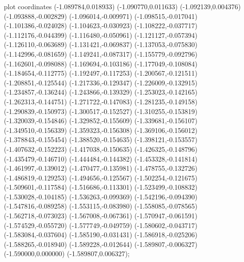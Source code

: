 { plot coordinates {(-1.089784,0.018933) (-1.090770,0.011633) (-1.092139,0.004376) (-1.093888,-0.002829) (-1.096014,-0.009971) (-1.098515,-0.017041) (-1.101386,-0.024028) (-1.104623,-0.030923) (-1.108222,-0.037717) (-1.112176,-0.044399) (-1.116480,-0.050961) (-1.121127,-0.057394) (-1.126110,-0.063689) (-1.131421,-0.069837) (-1.137053,-0.075830) (-1.142996,-0.081659) (-1.149241,-0.087317) (-1.155779,-0.092796) (-1.162601,-0.098088) (-1.169694,-0.103186) (-1.177049,-0.108084) (-1.184654,-0.112775) (-1.192497,-0.117253) (-1.200567,-0.121511) (-1.208851,-0.125544) (-1.217336,-0.129347) (-1.226009,-0.132915) (-1.234857,-0.136244) (-1.243866,-0.139329) (-1.253023,-0.142165) (-1.262313,-0.144751) (-1.271722,-0.147083) (-1.281235,-0.149158) (-1.290839,-0.150973) (-1.300517,-0.152527) (-1.310255,-0.153819) (-1.320039,-0.154846) (-1.329852,-0.155609) (-1.339681,-0.156107) (-1.349510,-0.156339) (-1.359323,-0.156308) (-1.369106,-0.156012) (-1.378843,-0.155454) (-1.388520,-0.154635) (-1.398121,-0.153557) (-1.407632,-0.152223) (-1.417038,-0.150635) (-1.426325,-0.148796) (-1.435479,-0.146710) (-1.444484,-0.144382) (-1.453328,-0.141814) (-1.461997,-0.139012) (-1.470477,-0.135981) (-1.478755,-0.132726) (-1.486819,-0.129253) (-1.494656,-0.125567) (-1.502254,-0.121675) (-1.509601,-0.117584) (-1.516686,-0.113301) (-1.523499,-0.108832) (-1.530028,-0.104185) (-1.536263,-0.099369) (-1.542196,-0.094390) (-1.547816,-0.089258) (-1.553115,-0.083980) (-1.558085,-0.078565) (-1.562718,-0.073023) (-1.567008,-0.067361) (-1.570947,-0.061591) (-1.574529,-0.055720) (-1.577749,-0.049759) (-1.580602,-0.043717) (-1.583084,-0.037604) (-1.585190,-0.031431) (-1.586918,-0.025206) (-1.588265,-0.018940) (-1.589228,-0.012644) (-1.589807,-0.006327) (-1.590000,0.000000) (-1.589807,0.006327)};
}
